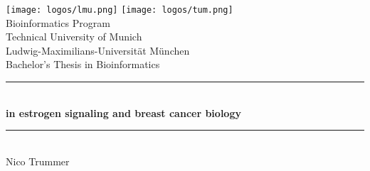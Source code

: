 \documentclass[pdftex,12pt,a4paper]{report}
\newcommand{\HRule}{\rule{\linewidth}{0.5mm}}
\begin{document}
\setcounter{tocdepth}{4}



\begin{titlepage}

    \begin{center}

        \texttt{[image: logos/lmu.png]}
        \hfill
        \texttt{[image: logos/tum.png]}
        \\[5cm]

        {\Large Bioinformatics Program}\\[0.5cm]
        {\Large Technical University of Munich}\\[0.5cm]
        {\Large Ludwig-Maximilians-Universit\"at M\"unchen}\\[2cm]
        {\Large Bachelor's Thesis in Bioinformatics}\\[1.5cm]

        \HRule \\[0.4cm]
        { \huge \bfseries {} in estrogen signaling and breast
        cancer
        biology}\\[0.4cm]

        \HRule \\[1.5cm]

        {\Large Nico Trummer}\\[2.5cm]

        \vfill
    \end{center}
\end{titlepage}
\end{document}
